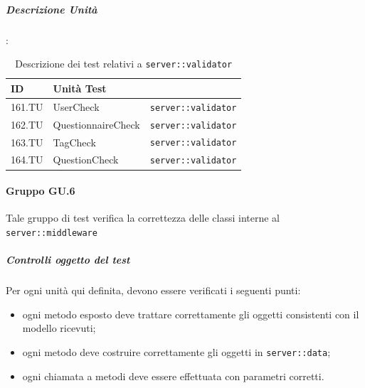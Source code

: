 \documentclass[12pt,a4paper]{article}
\begin{document}
\subparagraph{Descrizione Unità}:
\begin{table}[H]
	\begin{center}
		\begin{tabular}{p{} p{} p{}}
			\toprule
			\textbf{ID}   & \textbf{Unità Test}	& \textbf{\mgls{package}} \\ \midrule
			\midrule
			161.TU & UserCheck & \texttt{server::validator}\\ \midrule
			162.TU & QuestionnaireCheck & \texttt{server::validator}\\ \midrule
			163.TU & TagCheck & \texttt{server::validator}\\ \midrule
			164.TU & QuestionCheck & \texttt{server::validator}\\ \midrule			
			\bottomrule
		\end{tabular}
	\end{center}
	\caption{Descrizione dei test relativi a \texttt{server::validator}}
\end{table}

\paragraph{Gruppo GU.6}
Tale gruppo di test verifica la correttezza delle classi interne al  \texttt{server::middleware}

\subparagraph{Controlli oggetto del test}
Per ogni unità  qui definita, devono essere verificati i seguenti punti:

\begin{itemize}
	\item ogni metodo esposto deve trattare correttamente gli oggetti consistenti con il modello ricevuti;
	\item ogni metodo deve costruire correttamente gli oggetti in \texttt{server::data};
	\item ogni chiamata a metodi deve essere effettuata con parametri corretti.
\end{itemize}
\end{document}
